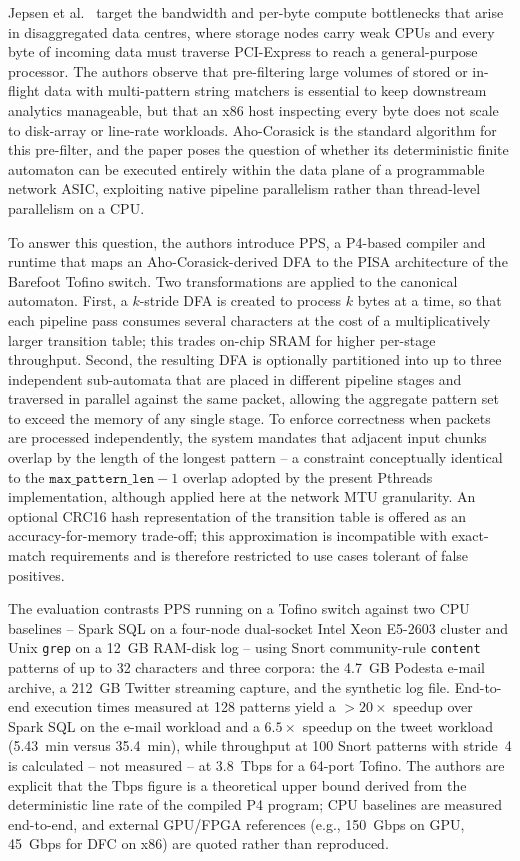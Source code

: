 
Jepsen et al.\ \cite{Jepsen2019PISA} target the bandwidth and per-byte compute bottlenecks that arise in disaggregated data centres, where storage nodes carry weak CPUs and every byte of incoming data must traverse PCI-Express to reach a general-purpose processor. The authors observe that pre-filtering large volumes of stored or in-flight data with multi-pattern string matchers is essential to keep downstream analytics manageable, but that an x86 host inspecting every byte does not scale to disk-array or line-rate workloads. Aho-Corasick is the standard algorithm for this pre-filter, and the paper poses the question of whether its deterministic finite automaton can be executed entirely within the data plane of a programmable network ASIC, exploiting native pipeline parallelism rather than thread-level parallelism on a CPU.

To answer this question, the authors introduce PPS, a P4-based compiler and runtime that maps an Aho-Corasick-derived DFA to the PISA architecture of the Barefoot Tofino switch. Two transformations are applied to the canonical automaton. First, a $k$-stride DFA is created to process $k$ bytes at a time, so that each pipeline pass consumes several characters at the cost of a multiplicatively larger transition table; this trades on-chip SRAM for higher per-stage throughput. Second, the resulting DFA is optionally partitioned into up to three independent sub-automata that are placed in different pipeline stages and traversed in parallel against the same packet, allowing the aggregate pattern set to exceed the memory of any single stage. To enforce correctness when packets are processed independently, the system mandates that adjacent input chunks overlap by the length of the longest pattern -- a constraint conceptually identical to the $\texttt{max\_pattern\_len}-1$ overlap adopted by the present Pthreads implementation, although applied here at the network MTU granularity. An optional CRC16 hash representation of the transition table is offered as an accuracy-for-memory trade-off; this approximation is incompatible with exact-match requirements and is therefore restricted to use cases tolerant of false positives.

The evaluation contrasts PPS running on a Tofino switch against two CPU baselines -- Spark SQL on a four-node dual-socket Intel Xeon E5-2603 cluster and Unix \texttt{grep} on a 12~GB RAM-disk log -- using Snort community-rule \texttt{content} patterns of up to 32 characters and three corpora: the 4.7~GB Podesta e-mail archive, a 212~GB Twitter streaming capture, and the synthetic log file. End-to-end execution times measured at 128 patterns yield a $>20\times$ speedup over Spark SQL on the e-mail workload and a $6.5\times$ speedup on the tweet workload (5.43~min versus 35.4~min), while throughput at 100 Snort patterns with stride~4 is calculated -- not measured -- at $3.8$~Tbps for a 64-port Tofino. The authors are explicit that the Tbps figure is a theoretical upper bound derived from the deterministic line rate of the compiled P4 program; CPU baselines are measured end-to-end, and external GPU/FPGA references (e.g., 150~Gbps on GPU, 45~Gbps for DFC on x86) are quoted rather than reproduced.

